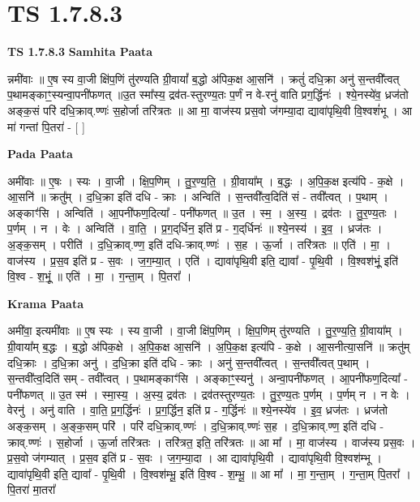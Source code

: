 \documentclass[17pt]{extarticle}
\begin{document}
\section*{ TS 1.7.8.3 }

\textbf{TS 1.7.8.3 } \newline
\textbf{Samhita Paata} \newline

न्नमी॑वाः ॥ ए॒ष स्य वा॒जी क्षि॑प॒णिं तु॑रण्यति ग्री॒वायां᳚ ब॒द्धो अ॑पिक॒क्ष आ॒सनि॑ । क्रतुं॑ दधि॒क्रा अनु॑ स॒न्तवी᳚त्वत् प॒थामङ्काꣳ॒॒स्यन्वा॒पनी॑फणत् ॥उ॒त स्मा᳚स्य॒ द्रव॑त-स्तुरण्य॒तः प॒र्णं न वे-रनु॑ वाति प्रग॒र्द्धिनः॑ । श्ये॒नस्ये॑व॒ ध्रज॑तो अङ्क॒सं परि॑ दधि॒क्राव्.ण्णः॑ स॒होर्जा तरि॑त्रतः ॥ आ मा॒ वाज॑स्य प्रस॒वो ज॑गम्या॒दा द्यावा॑पृथि॒वी वि॒श्वशं॑भू । आ मा॑ गन्तां पि॒तरा॑ - [ ] \newline

\textbf{Pada Paata} \newline

अमी॑वाः ॥ ए॒षः । स्यः । वा॒जी । क्षि॒प॒णिम् । तु॒र॒ण्य॒ति॒ । ग्री॒वाया᳚म् । ब॒द्धः । अ॒पि॒क॒क्ष इत्य॑पि - क॒क्षे । आ॒सनि॑ ॥ क्रतु᳚म् । द॒धि॒क्रा इति॑ दधि - क्राः । अन्विति॑ । स॒न्तवी᳚त्व॒दिति॑ सं - तवी᳚त्वत् । प॒थाम् । अङ्काꣳ॑सि । अन्विति॑ । आ॒पनी॑फण॒दित्या᳚ - पनी॑फणत् ॥ उ॒त । स्म॒ । अ॒स्य॒ । द्रव॑तः । तु॒र॒ण्य॒तः । प॒र्णम् । न । वेः । अन्विति॑ । वा॒ति॒ । प्र॒ग॒द्‌र्धिन॒ इति॑ प्र - ग॒द्‌र्धिनः॑ ॥ श्ये॒नस्य॑ । इ॒व॒ । ध्रज॑तः । अ॒ङ्क॒सम् । परीति॑ । द॒धि॒क्राव्.ण्ण॒ इति॑ दधि-क्राव्.ण्णः॑ । स॒ह । ऊ॒र्जा । तरि॑त्रतः ॥ एति॑ । मा॒ । वाज॑स्य । प्र॒स॒व इति॑ प्र - स॒वः । ज॒ग॒म्या॒त् । एति॑ । द्यावा॑पृथि॒वी इति॒ द्यावा᳚ - पृ॒थि॒वी । वि॒श्वश॑भूं॒ इति॑ वि॒श्व - श॒भूं॒ ॥ एति॑ । मा॒ । ग॒न्ता॒म् । पि॒तरा᳚ ।  \newline


\textbf{Krama Paata} \newline

अमी॑वा॒ इत्यमी॑वाः ॥ ए॒ष स्यः । स्य वा॒जी । वा॒जी क्षि॑प॒णिम् । क्षि॒प॒णिम् तु॑रण्यति । तु॒र॒ण्य॒ति॒ ग्री॒वाया᳚म् । ग्री॒वाया᳚म् ब॒द्धः । ब॒द्धो अ॑पिक॒क्षे । अ॒पि॒क॒क्ष आ॒सनि॑ । अ॒पि॒क॒क्ष इत्य॑पि - क॒क्षे । आ॒सनीत्या॒सनि॑ ॥ क्रतु॑म् दधि॒क्राः । द॒धि॒क्रा अनु॑ । द॒धि॒क्रा इति॑ दधि - क्राः । अनु॑ स॒न्तवी᳚त्वत् । स॒न्तवी᳚त्वत् प॒थाम् । स॒न्तवी᳚त्व॒दिति॑ सम् - तवी᳚त्वत् । प॒थामङ्काꣳ॑सि । अङ्काꣳ॒॒स्यनु॑ । अन्वा॒पनी॑फणत् । आ॒पनी॑फण॒दित्या᳚ - पनी॑फणत् ॥ उ॒त स्म॑ । स्मा॒स्य॒ । अ॒स्य॒ द्रव॑तः । द्रव॑तस्तुरण्य॒तः । तु॒र॒ण्य॒तः प॒र्णम् । प॒र्णम् न । न वेः । वेरनु॑ । अनु॑ वाति । वा॒ति॒ प्र॒ग॒र्द्धिनः॑ । प्र॒ग॒र्द्धिन॒ इति॑ प्र - ग॒र्द्धिनः॑ ॥ श्ये॒नस्ये॑व । इ॒व॒ ध्रज॑तः । ध्रज॑तो अङ्क॒सम् । अ॒ङ्क॒सम् परि॑ । परि॑ दधि॒क्राव्.ण्णः॑ । द॒धि॒क्राव्.ण्णः॑ स॒ह । द॒धि॒क्राव्.ण्ण॒ इति॑ दधि - क्राव्.ण्णः॑ । स॒होर्जा । ऊ॒र्जा तरि॑त्रतः । तरि॑त्रत॒ इति॒ तरि॑त्रतः ॥ आ मा᳚ । मा॒ वाज॑स्य । वाज॑स्य प्रस॒वः । प्र॒स॒वो ज॑गम्यात् । प्र॒स॒व इति॑ प्र - स॒वः । ज॒ग॒म्या॒दा । आ द्यावा॑पृथि॒वी । द्यावा॑पृथि॒वी वि॒श्वश॑म्भू । द्यावा॑पृथि॒वी इति॒ द्यावा᳚ - पृ॒थि॒वी । वि॒श्वश॑म्भू॒ इति॑ वि॒श्व - श॒म्भू॒ ॥ आ मा᳚ । मा॒ ग॒न्ता॒म् । ग॒न्ता॒म् पि॒तरा᳚ । पि॒तरा॑ मा॒तरा᳚ \newline
\end{document}
